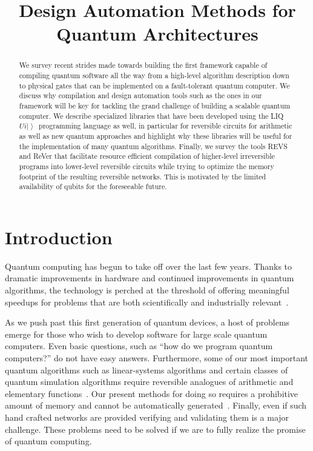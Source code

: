 \documentclass[conference]{IEEEtran}
\title{Design Automation Methods for Quantum Architectures}
\author{%
  \IEEEauthorblockN{Martin Roetteler \qquad Krysta M. Svore \qquad Nathan Wiebe}
  \IEEEauthorblockA{%
Microsoft Research, Redmond, WA, USA
  }
}
\newcommand{\ket}[1]{\left| #1\right\rangle}        %
\newcommand{\Liquid}{LIQ$Ui\ket{}$\ }
\begin{document}
\maketitle

\begin{abstract}
We survey recent strides made towards building the first framework capable of compiling quantum software all the way from a high-level algorithm description down to physical gates that can be implemented on a fault-tolerant quantum computer. We discuss why compilation and design automation tools such as the ones in our framework will be key for tackling the grand challenge of building a scalable quantum computer. We describe specialized libraries that have been developed using the \Liquid programming language as well, in particular for reversible circuits for arithmetic as well as new quantum approaches and highlight why these libraries will be useful for the implementation of many quantum algorithms. Finally, we survey the tools REVS and ReVer that facilitate resource efficient compilation of higher-level irreversible programs into lower-level reversible circuits while trying to optimize the memory footprint of the resulting reversible networks. This is motivated by the limited availability of qubits for the foreseeable future. 
\end{abstract}

\section{Introduction}
Quantum computing has begun to take off over the last few years.  Thanks to dramatic improvements in hardware and continued improvements in quantum algorithms, the technology
is perched at the threshold of offering meaningful speedups for problems that are both scientifically and industrially relevant~\cite{barends2014superconducting,cross2015quantum,o2016scalable,benedetti2016estimation}.  

As we push past this first generation of quantum devices, a host of problems emerge for those who wish to develop software for large scale quantum computers.  Even basic questions, such as ``how do we program quantum computers?'' do not have easy answers.  Furthermore, some of our most important quantum algorithms such as linear-systems algorithms and certain classes of quantum simulation algorithms require reversible analogues of arithmetic and elementary functions~\cite{harrow2009quantum,babbush2015exponentially,kivlichan2016bounding}.  Our present methods for doing so requires a prohibitive amount of memory and cannot be automatically generated~\cite{BHP+15}.  Finally, even if such hand crafted networks are provided verifying and validating them is a major challenge.  These problems need to be solved if we are to fully realize the promise of quantum computing.
\end{document}
